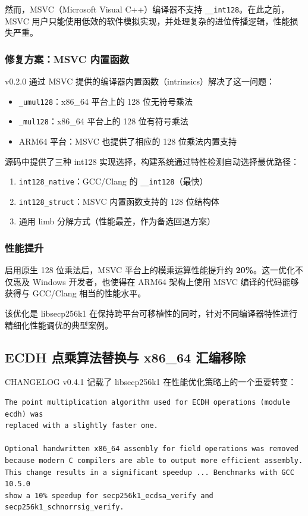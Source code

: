 \documentclass[a4paper,12pt]{ctexart}
\newcommand{\code}[1]{\texttt{#1}}
\begin{document}
然而，MSVC（Microsoft Visual C++）编译器不支持 \code{\_\_int128}。在此之前，MSVC 用户只能使用低效的软件模拟实现，并处理复杂的进位传播逻辑，性能损失严重。

\subsubsection{修复方案：MSVC 内置函数}

v0.2.0 通过 MSVC 提供的编译器内置函数（intrinsics）解决了这一问题：
\begin{itemize}[leftmargin=*]
  \item \code{\_umul128}：x86\_64 平台上的 128 位无符号乘法
  \item \code{\_mul128}：x86\_64 平台上的 128 位有符号乘法
  \item ARM64 平台：MSVC 也提供了相应的 128 位乘法内置支持
\end{itemize}

源码中提供了三种 int128 实现选择，构建系统通过特性检测自动选择最优路径：
\begin{enumerate}[leftmargin=*]
  \item \code{int128\_native}：GCC/Clang 的 \code{\_\_int128}（最快）
  \item \code{int128\_struct}：MSVC 内置函数支持的 128 位结构体
  \item 通用 limb 分解方式（性能最差，作为备选回退方案）
\end{enumerate}

\subsubsection{性能提升}

启用原生 128 位乘法后，MSVC 平台上的模乘运算性能提升约 \textbf{20\%}。这一优化不仅惠及 Windows 开发者，也使得在 ARM64 架构上使用 MSVC 编译的代码能够获得与 GCC/Clang 相当的性能水平。

该优化是 libsecp256k1 在保持跨平台可移植性的同时，针对不同编译器特性进行精细化性能调优的典型案例。
\subsection{ECDH 点乘算法替换与 x86\_64 汇编移除}

CHANGELOG v0.4.1 记载了 libsecp256k1 在性能优化策略上的一个重要转变：

\begin{codebox}
\begin{verbatim}
The point multiplication algorithm used for ECDH operations (module ecdh) was
replaced with a slightly faster one.

Optional handwritten x86_64 assembly for field operations was removed
because modern C compilers are able to output more efficient assembly.
This change results in a significant speedup ... Benchmarks with GCC 10.5.0
show a 10% speedup for secp256k1_ecdsa_verify and secp256k1_schnorrsig_verify.
\end{verbatim}
\end{codebox}
\end{document}
